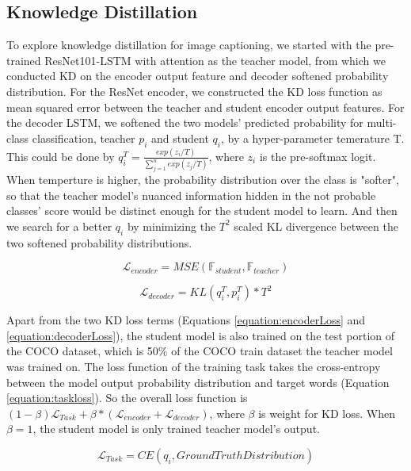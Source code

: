 \documentclass[10pt,twocolumn,letterpaper]{article}
\begin{document}
\subsection{Knowledge Distillation}
To explore knowledge distillation for image captioning, we started with the pre-trained ResNet101-LSTM with attention as the teacher model, from which we conducted KD on the encoder output feature and decoder softened probability distribution. For the ResNet encoder, we constructed the KD loss function as mean squared error between the teacher and student encoder output features. For the decoder LSTM, we softened the two models' predicted probability for multi-class classification, teacher $p_i$ and student $q_i$, by a hyper-parameter temerature T. This could be done by $q_i^T=\frac{exp(z_i/T)}{\sum_{j=1}^n exp(z_j/T)}$, where $z_i$ is the pre-softmax logit. When temperture is higher, the probability distribution over the class is "softer", so that the teacher model's nuanced information hidden in the not probable classes' score would be distinct enough for the student model to learn. And then we search for a better $q_i$ by minimizing the $T^2$ scaled KL divergence between the two softened probability distributions.

    \begin{equation}
        \mathcal{L}_{encoder} = MSE(\mathbb{F}_{student} , \mathbb{F}_{teacher})
	\label{equation:encoderLoss}
    \end{equation}

    \begin{equation}
        \mathcal{L}_{decoder}=KL(q^T_i,p^T_i)*T^2
	\label{equation:decoderLoss}
    \end{equation}

Apart from the two KD loss terms (Equations \ref{equation:encoderLoss} and \ref{equation:decoderLoss}), the student model is also trained on the test portion of the COCO dataset, which is 50\% of the COCO train dataset the teacher model was trained on. The loss function of the training task takes the cross-entropy between the model output probability distribution and target words (Equation \ref{equation:taskloss}). So the overall loss function is $(1-\beta)\mathcal{L}_{Task}+\beta*(\mathcal{L}_{encoder}+\mathcal{L}_{decoder})$, where $\beta$ is weight for KD loss. When $\beta=1$, the student model is only trained teacher model's output.

    \begin{equation}
        \mathcal{L}_{Task}=CE(q_i,Ground Truth Distribution)
	\label{equation:taskloss}
    \end{equation}
\end{document}
